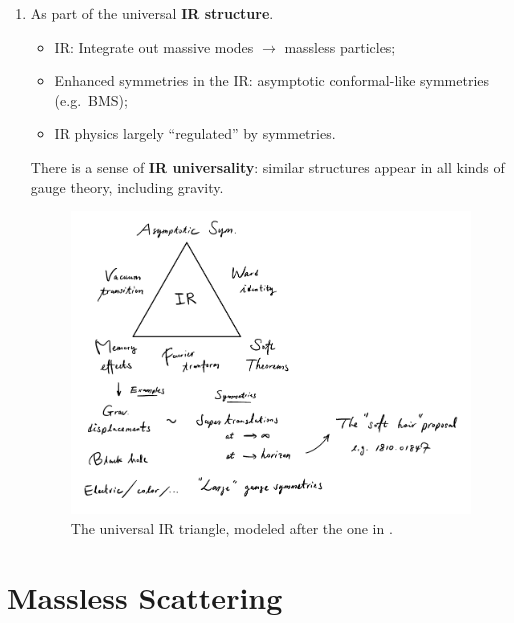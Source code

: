 \documentclass[a4paper
	,10pt
]{article}
\begin{document}
\begin{enumerate}
	
	\item As part of the universal \textbf{IR structure}. 
	
	\begin{itemize}[noitemsep]
	\item IR: Integrate out massive modes $\to$ massless particles;
	
	\item Enhanced symmetries in the IR: asymptotic conformal-like symmetries (e.g.~BMS);
	
	\item IR physics largely ``regulated'' by symmetries.
	
	\end{itemize}
	
	There is a sense of \textbf{IR universality}: similar structures appear in all kinds of gauge theory, including gravity. 
	
	\begin{figure}[!h]
	\centering
	\includegraphics[width=.85\linewidth]{img/IRtriangle.pdf}
	\caption[The universal IR triangle]{
		The universal IR triangle, modeled after the one in \cite{Strominger:2017zoo}. 
	}
	\end{figure}
	
	\end{enumerate}
	
\section{Massless Scattering}
	
\end{document}
